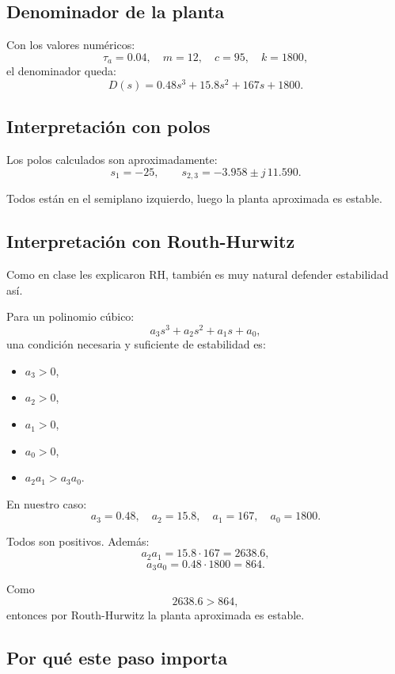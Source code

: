 \documentclass[11pt]{article}
\begin{document}
\subsection{Denominador de la planta}

Con los valores num\'ericos:
\[
\tau_a = 0.04,\quad
m = 12,\quad
c=95,\quad
k=1800,
\]
el denominador queda:
\begin{equation}
D(s)=0.48s^3 + 15.8s^2 + 167s + 1800.
\label{eq:den}
\end{equation}

\subsection{Interpretaci\'on con polos}

Los polos calculados son aproximadamente:
\[
s_1=-25,\qquad
s_{2,3}=-3.958\pm j\,11.590.
\]

Todos est\'an en el semiplano izquierdo, luego la planta aproximada es estable.

\subsection{Interpretaci\'on con Routh-Hurwitz}

Como en clase les explicaron RH, tambi\'en es muy natural defender estabilidad as\'i.

Para un polinomio c\'ubico:
\[
a_3s^3+a_2s^2+a_1s+a_0,
\]
una condici\'on necesaria y suficiente de estabilidad es:

\begin{itemize}[leftmargin=1.2cm]
\item $a_3>0$,
\item $a_2>0$,
\item $a_1>0$,
\item $a_0>0$,
\item $a_2a_1>a_3a_0$.
\end{itemize}

En nuestro caso:
\[
a_3=0.48,\quad
a_2=15.8,\quad
a_1=167,\quad
a_0=1800.
\]

Todos son positivos. Adem\'as:
\[
a_2a_1 = 15.8\cdot167 = 2638.6,
\]
\[
a_3a_0 = 0.48\cdot1800 = 864.
\]

Como
\[
2638.6 > 864,
\]
entonces por Routh-Hurwitz la planta aproximada es estable.

\subsection{Por qu\'e este paso importa}
\end{document}
